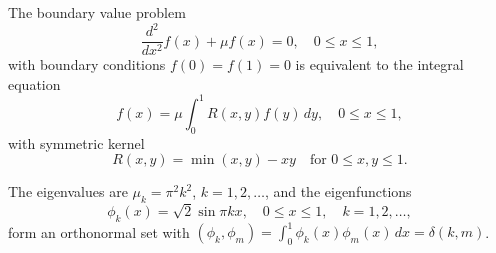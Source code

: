 The boundary value problem
$$\frac{d^2}{dx^2} f(x) + \mu f(x) = 0, \quad 0 \leq x \leq 1,$$
with boundary conditions $f(0) = f(1) = 0$ is equivalent to the integral equation
$$f(x) = \mu \int_0^1 R(x,y) f(y) \, dy, \quad 0 \leq x \leq 1,$$
with symmetric kernel
$$R(x,y) = \min(x,y) - xy \quad \text{for } 0 \leq x, y \leq 1.$$

The eigenvalues are $\mu_k = \pi^2 k^2$, $k = 1, 2, \ldots$, and the eigenfunctions
$$\phi_k(x) = \sqrt{2} \sin \pi k x, \quad 0 \leq x \leq 1, \quad k = 1, 2, \ldots,$$
form an orthonormal set with $(\phi_k, \phi_m) = \int_0^1 \phi_k(x) \phi_m(x) \, dx = \delta(k,m)$.

